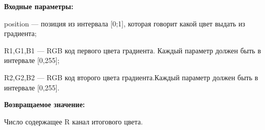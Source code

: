 \textbf{Входные параметры:}  

position --- позиция из интервала [0;1], которая говорит какой цвет выдать из градиента;
 
    R1,G1,B1 --- RGB код первого цвета градиента. Каждый параметр должен быть в интервале [0,255];
 
    R2,G2,B2 --- RGB код второго цвета градиента.Каждый параметр должен быть в интервале [0,255].

\textbf{Возвращаемое значение:}

Число содержащее R канал итогового цвета.